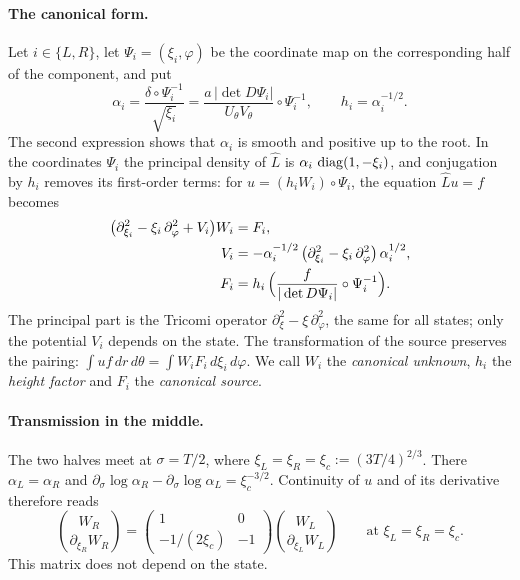 \paragraph{The canonical form.}
Let $i\in\{L,R\}$, let $\Psi_i=(\xi_i,\varphi)$ be the coordinate map
on the corresponding half of the component, and put
\[
 \alpha_i=\frac{\delta\circ\Psi_i^{-1}}{\sqrt{\xi_i}}
 =\frac{a\,|\det D\Psi_i|}{U_\theta V_\theta}\circ\Psi_i^{-1},
 \qquad h_i=\alpha_i^{-1/2} .
\]
The second expression shows that $\alpha_i$ is smooth and positive up
to the root. In the coordinates $\Psi_i$ the principal density of
$\widehat L$ is $\alpha_i\,\operatorname{diag}(1,-\xi_i)$, and conjugation by
$h_i$ removes its first-order terms: for
$u=(h_iW_i)\circ\Psi_i$, the equation $\widehat Lu=f$ becomes
\begin{equation}\label{eq:fixed-strip-airy-equation}
 \begin{split}
 \bigl(\partial_{\xi_i}^2-\xi_i\,\partial_\varphi^2+V_i\bigr)W_i&=F_i,\\
 V_i&=-\alpha_i^{-1/2}\,
       \bigl(\partial_{\xi_i}^2-\xi_i\,\partial_\varphi^2\bigr)\,
       \alpha_i^{1/2},\\
 F_i&=h_i\,\Bigl(\frac{f}{|\det D\Psi_i|}\circ\Psi_i^{-1}\Bigr).
 \end{split}
\end{equation}
The principal part is the Tricomi operator
$\partial_\xi^2-\xi\,\partial_\varphi^2$, the same for all states;
only the potential $V_i$ depends on the state. The transformation of
the source preserves the pairing:
$\int uf\,dr\,d\theta=\int W_iF_i\,d\xi_i\,d\varphi$. We call
$W_i$ the \emph{canonical unknown}, $h_i$ the \emph{height factor}
and $F_i$ the \emph{canonical source}.

\paragraph{Transmission in the middle.}
The two halves meet at $\sigma=T/2$, where
$\xi_L=\xi_R=\xi_c:=(3T/4)^{2/3}$. There $\alpha_L=\alpha_R$ and
$\partial_\sigma\log\alpha_R-\partial_\sigma\log\alpha_L=\xi_c^{-3/2}$.
Continuity of $u$ and of its derivative therefore reads
\begin{equation}\label{eq:fixed-strip-cut}
 \binom{W_R}{\partial_{\xi_R}W_R}
 =\begin{pmatrix}1&0\\-1/(2\xi_c)&-1\end{pmatrix}
       \binom{W_L}{\partial_{\xi_L}W_L}
 \qquad\text{at }\xi_L=\xi_R=\xi_c .
\end{equation}
This matrix does not depend on the state.

